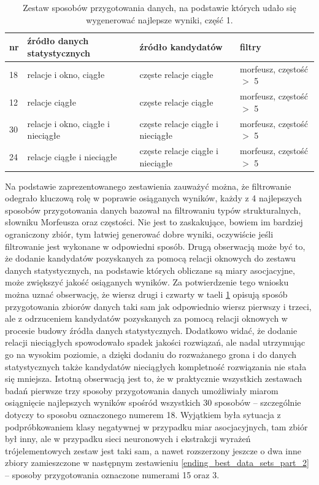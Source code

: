 \documentclass[11pt,a4paper]{llncs}
\begin{document}
\begin{table}[h!]
\centering
\begin{tabular}{ l | l | l | l }
	\toprule
	\textbf{nr} 	& \textbf{źródło danych statystycznych}			& \textbf{źródło kandydatów}		& \textbf{filtry}					\\
	\midrule
	18	& relacje i okno, ciągłe				& częste relacje ciągłe	& morfeusz, częstość $>$ 5	\\
	12	& relacje ciągłe						& częste relacje ciągłe & morfeusz, częstość $>$ 5	\\
	30	& relacje i okno, ciągłe i nieciągłe	& częste relacje ciągłe	i nieciągłe	& morfeusz, częstość $>$ 5	\\
	24	& relacje ciągłe i nieciągłe			& częste relacje ciągłe i nieciągłe	& morfeusz, częstość $>$ 5	\\
	\bottomrule
\end{tabular}
\caption[Zestaw sposobów przygotowania danych, na podstawie których udało się wygenerować najlepsze wyniki, część 1]{Zestaw sposobów przygotowania danych, na podstawie których udało się wygenerować najlepsze wyniki, część 1.}
\label{ending_best_data_sets_part_1}
\end{table}

Na podstawie zaprezentowanego zestawienia zauważyć można, że filtrowanie odegrało kluczową rolę w poprawie osiąganych wyników, każdy z 4 najlepszych sposobów przygotowania danych bazował na filtrowaniu typów strukturalnych, słowniku Morfeusza oraz częstości.
Nie jest to zaskakujące, bowiem im bardziej ograniczony zbiór, tym łatwiej generować dobre wyniki, oczywiście jeśli filtrowanie jest wykonane w odpowiedni sposób.
Drugą obserwacją może być to, że dodanie kandydatów pozyskanych za pomocą relacji oknowych do zestawu danych statystycznych, na podstawie których obliczane są miary asocjacyjne, może zwiększyć jakość osiąganych wyników.
Za potwierdzenie tego wniosku można uznać obserwację, że wiersz drugi i czwarty w taeli \ref{ending_best_data_sets_part_1} opisują sposób przygotowania zbiorów danych taki sam jak odpowiednio wiersz pierwszy i trzeci, ale z odrzuceniem kandydatów pozyskanych za pomocą relacji oknowych w procesie budowy źródła danych statystycznych.
Dodatkowo widać, że dodanie relacji nieciągłych spowodowało spadek jakości rozwiązań, ale nadal utrzymując go na wysokim poziomie, a dzięki dodaniu do rozważanego grona i do danych statystycznych także kandydatów nieciągłych kompletność rozwiązania nie stała się mniejsza.
Istotną obserwacją jest to, że w praktycznie wszystkich zestawach badań pierwsze trzy sposoby przygotowania danych umożliwiały miarom osiągnięcie najlepszych wyników spośród wszystkich 30 sposobów -- szczególnie dotyczy to sposobu oznaczonego numerem 18.
Wyjątkiem była sytuacja z podpróbkowaniem klasy negatywnej w przypadku miar asocjacyjnych, tam zbiór był inny, ale w przypadku sieci neuronowych i ekstrakcji wyrażeń trójelementowych zestaw jest taki sam, a nawet rozszerzony jeszcze o dwa inne zbiory zamieszczone w następnym zestawieniu \ref{ending_best_data_sets_part_2} -- sposoby przygotowania oznaczone numerami 15 oraz 3.
\end{document}
